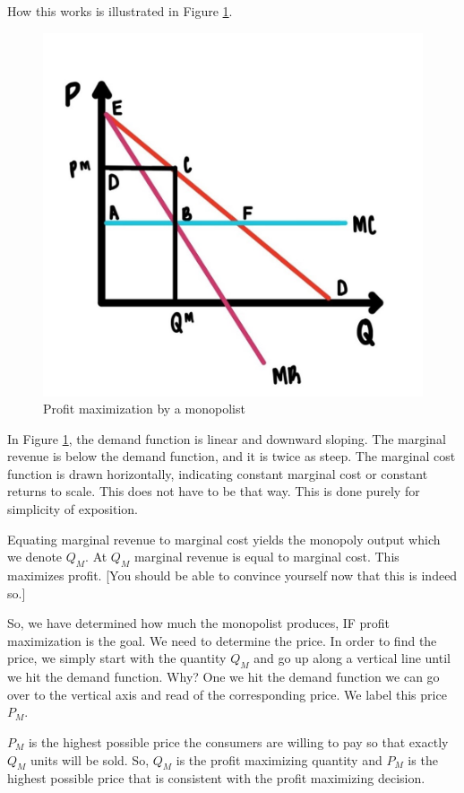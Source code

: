 \documentclass[
]{book}
\begin{document}
How this works is illustrated in Figure \ref{fig:monopoly03}.

\begin{figure}

{\centering \includegraphics[width=0.75\linewidth]{img/monopoly/fig3} 

}

\caption{Profit maximization by a monopolist}\label{fig:monopoly03}
\end{figure}

In Figure \ref{fig:monopoly03}, the demand function is linear and downward sloping. The marginal revenue is below the demand function, and it is twice as steep. The marginal cost function is drawn horizontally, indicating constant marginal cost or constant returns to scale. This does not have to be that way. This is done purely for simplicity of exposition.

Equating marginal revenue to marginal cost yields the monopoly output which we denote \(Q_M\). At \(Q_M\) marginal revenue is equal to marginal cost. This maximizes profit. {[}You should be able to convince yourself now that this is indeed so.{]}

So, we have determined how much the monopolist produces, IF profit maximization is the goal. We need to determine the price. In order to find the price, we simply start with the quantity \(Q_M\) and go up along a vertical line until we hit the demand function. Why? One we hit the demand function we can go over to the vertical axis and read of the corresponding price. We label this price \(P_M\).

\(P_M\) is the highest possible price the consumers are willing to pay so that exactly \(Q_M\) units will be sold. So, \(Q_M\) is the profit maximizing quantity and \(P_M\) is the highest possible price that is consistent with the profit maximizing decision.
\end{document}
